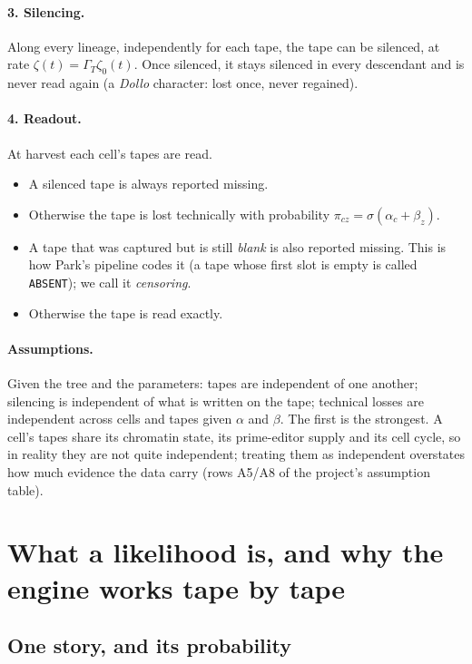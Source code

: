 \documentclass[11pt]{article}
\newcommand{\GamT}{\Gamma_T}
\newcommand{\sig}{\sigma}
\begin{document}
\paragraph{3. Silencing.} Along every lineage, independently for each tape, the tape can be
silenced, at rate $\zeta(t)=\GamT\zeta_0(t)$. Once silenced, it stays silenced in every descendant and
is never read again (a \emph{Dollo} character: lost once, never regained).

\paragraph{4. Readout.} At harvest each cell's tapes are read.
\begin{itemize}\itemsep0pt
\item A silenced tape is always reported missing.
\item Otherwise the tape is lost technically with probability $\pi_{cz}=\sig(\alpha_c+\beta_z)$.
\item A tape that was captured but is still \emph{blank} is also reported missing. This is how Park's
  pipeline codes it (a tape whose first slot is empty is called \texttt{ABSENT}); we call it
  \emph{censoring}.
\item Otherwise the tape is read exactly.
\end{itemize}

\paragraph{Assumptions.} Given the tree and the parameters: tapes are independent of one another;
silencing is independent of what is written on the tape; technical losses are independent across
cells and tapes given $\alpha$ and $\beta$. The first is the strongest. A cell's tapes share its
chromatin state, its prime-editor supply and its cell cycle, so in reality they are not quite
independent; treating them as independent overstates how much evidence the data carry (rows A5/A8 of
the project's assumption table).

\section{What a likelihood is, and why the engine works tape by tape}\label{sec:lik}

\subsection{One story, and its probability}
\end{document}
